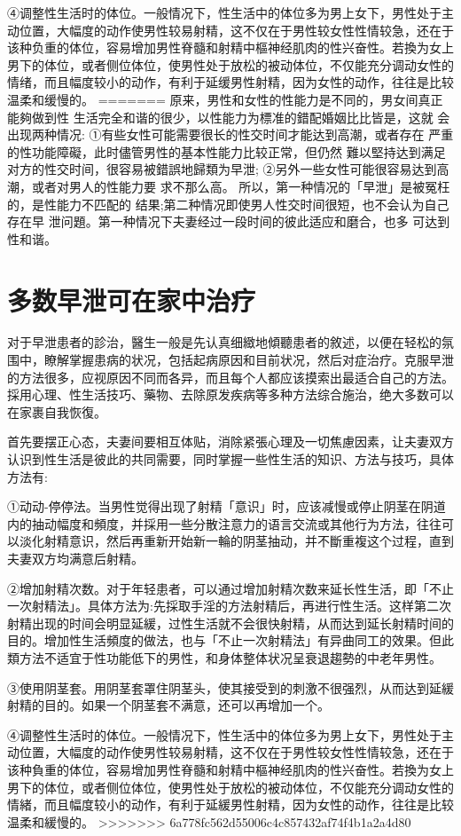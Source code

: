 \documentclass[12pt,UTF8]{ctexbook}
\begin{document}
④调整性生活时的体位。一般情况下，性生活中的体位多为男上女下，男性处于主动位置，大幅度的动作使男性较易射精，这不仅在于男性较女性性情较急，还在于该种负重的体位，容易增加男性脊髓和射精中樞神经肌肉的性兴奋性。若換为女上男下的体位，或者侧位体位，使男性处于放松的被动体位，不仅能充分调动女性的情绪，而且幅度较小的动作，有利于延缓男性射精，因为女性的动作，往往是比较温柔和缓慢的。
=======
原来，男性和女性的性能力是不同的，男女间真正能夠做到性
生活完全和谐的很少，以性能力为標准的錯配婚姻比比皆是，这就
会出现两种情况:
①有些女性可能需要很长的性交时间才能达到高潮，或者存在
严重的性功能障礙，此时儘管男性的基本性能力比较正常，但仍然
難以堅持达到满足对方的性交时间，很容易被錯誤地歸類为早泄;
②另外一些女性可能很容易达到高潮，或者对男人的性能力要
求不那么高。
所以，第一种情况的「早泄」是被冤枉的，是性能力不匹配的
结果;第二种情况即使男人性交时间很短，也不会认为自己存在早
泄问題。第一种情况下夫妻经过一段时间的彼此适应和磨合，也多
可达到性和谐。

\section{多数早泄可在家中治疗}

对于早泄患者的診治，醫生一般是先认真细緻地傾聽患者的敘述，以便在轻松的氛围中，瞭解掌握患病的状况，包括起病原因和目前状况，然后对症治疗。克服早泄的方法很多，应视原因不同而各异，而且每个人都应该摸索出最适合自己的方法。採用心理、性生活技巧、藥物、去除原发疾病等多种方法综合施治，绝大多数可以在家裹自我恢復。

首先要摆正心态，夫妻间要相互体贴，消除紧張心理及一切焦慮因素，让夫妻双方认识到性生活是彼此的共同需要，同时掌握一些性生活的知识、方法与技巧，具体方法有:

①动动-停停法。当男性觉得出现了射精「意识」时，应该减慢或停止阴茎在阴道内的抽动幅度和頻度，并採用一些分散注意力的语言交流或其他行为方法，往往可以淡化射精意识，然后再重新开始新一輪的阴茎抽动，并不斷重複这个过程，直到夫妻双方均满意后射精。

②增加射精次数。对于年轻患者，可以通过增加射精次数来延长性生活，即「不止一次射精法」。具体方法为:先採取手淫的方法射精后，再进行性生活。这样第二次射精出现的时间会明显延緩，过性生活就不会很快射精，从而达到延长射精时间的目的。增加性生活頻度的做法，也与「不止一次射精法」有异曲同工的效果。但此類方法不适宜于性功能低下的男性，和身体整体状况呈衰退趨勢的中老年男性。

③使用阴茎套。用阴茎套罩住阴茎头，使其接受到的刺激不很强烈，从而达到延緩射精的目的。如果一个阴茎套不满意，还可以再增加一个。

④调整性生活时的体位。一般情况下，性生活中的体位多为男上女下，男性处于主动位置，大幅度的动作使男性较易射精，这不仅在于男性较女性性情较急，还在于该种負重的体位，容易增加男性脊髓和射精中樞神经肌肉的性兴奋性。若換为女上男下的体位，或者侧位体位，使男性处于放松的被动体位，不仅能充分调动女性的情緒，而且幅度较小的动作，有利于延緩男性射精，因为女性的动作，往往是比较温柔和緩慢的。
>>>>>>> 6a778fc562d55006c4c857432af74f4b1a2a4d80
\end{document}
